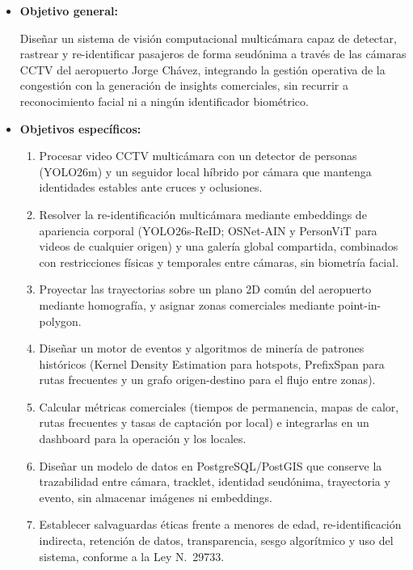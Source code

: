 \documentclass[12pt,a4paper]{article}
\begin{document}
\begin{itemize}
    \item \textbf{Objetivo general:}

    Diseñar un sistema de visión computacional multicámara capaz de
    detectar, rastrear y re-identificar pasajeros de forma seudónima a
    través de las cámaras CCTV del aeropuerto Jorge Chávez, integrando la
    gestión operativa de la congestión con la generación de insights
    comerciales, sin recurrir a reconocimiento facial ni a ningún
    identificador biométrico.

    \item \textbf{Objetivos específicos:}
    \begin{enumerate}
        \item Procesar video CCTV multicámara con un detector de personas
        (YOLO26m) y un seguidor local híbrido por cámara que mantenga
        identidades estables ante cruces y oclusiones.
        \item Resolver la re-identificación multicámara mediante
        embeddings de apariencia corporal (YOLO26s-ReID; OSNet-AIN y
        PersonViT para videos de cualquier origen) y una galería global
        compartida, combinados con restricciones físicas y
        temporales entre cámaras, sin biometría facial.
        \item Proyectar las trayectorias sobre un plano 2D común del
        aeropuerto mediante homografía, y asignar zonas comerciales
        mediante point-in-polygon.
        \item Diseñar un motor de eventos y algoritmos de minería de
        patrones históricos (Kernel Density Estimation para hotspots,
        PrefixSpan para rutas frecuentes y un grafo origen-destino para
        el flujo entre zonas).
        \item Calcular métricas comerciales (tiempos de permanencia,
        mapas de calor, rutas frecuentes y tasas de captación por local)
        e integrarlas en un dashboard para la operación y los locales.
        \item Diseñar un modelo de datos en PostgreSQL/PostGIS que
        conserve la trazabilidad entre cámara, tracklet, identidad
        seudónima, trayectoria y evento, sin almacenar imágenes ni
        embeddings.
        \item Establecer salvaguardas éticas frente a menores de edad,
        re-identificación indirecta, retención de datos, transparencia,
        sesgo algorítmico y uso del sistema, conforme a la Ley
        N.\textdegree~29733.
    \end{enumerate}
\end{itemize}
\end{document}
